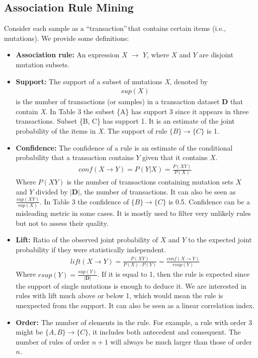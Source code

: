 \documentclass[twoside,twocolumn]{article}
\begin{document}
	\subsection{Association Rule Mining}
	Consider each sample as a \textquotedblleft transaction\textquotedblright$\,$that contains certain items (i.e., mutations). We provide some definitions:
	\begin{itemize}
		\item \textbf{Association rule:} An expression $X$ $\rightarrow$ $Y$, where $X$ and $Y$ are disjoint mutation subsets. 
		\item \textbf{Support:} The support of a subset of mutations \textit{X}, denoted by 
		\begin{align*}
			sup(X)
		\end{align*} is the number of transactions (or samples) in a transaction dataset \textbf{D} that contain \textit{X}. In Table 3 the subset \{A\} has support 3 since it appears in three transactions. Subset \{B, C\} has support 1. It is an estimate of the joint probability of the items in \textit{X}. The support of rule $\{B\} \rightarrow \{C\}$ is 1.
		\item \textbf{Confidence:} The confidence of a rule is an estimate of the conditional probability that a transaction contains $Y$ given that it contains $X$.
		\begin{align*}
			conf(X \rightarrow Y) = P(Y|X) = \frac{P(XY)}{P(X)}
		\end{align*}
		Where $P(XY)$ is the number of transactions containing mutation sets $X$ and $Y$ divided by $|\mathbf{D}|$, the number of transactions. It can also be seen as $\frac{sup(XY)}{sup(X)}$. In Table 3 the confidence of $\{B\} \rightarrow \{C\}$ is 0.5. Confidence can be a misleading metric in some cases. It is mostly used to filter very unlikely rules but not to assess their quality.
		\item \textbf{Lift:} Ratio of the observed joint probability of $X$ and $Y$ to the expected joint probability if they were statistically independent.	
		\begin{align*}
			lift(X \rightarrow Y) = \frac{P(XY)}{P(X)\cdot P(Y)} = \frac{conf(X\rightarrow Y)}{rsup(Y)}
		\end{align*}
		Where $rsup(Y) = \frac{sup(Y)}{|\mathbf{D}|}$. If it is equal to 1, then the rule is expected since the support of single mutations is enough to deduce it. We are interested in rules with lift much above or below 1, which would mean the rule is unexpected from the support. It can also be seen as a linear correlation index. 
		\item \textbf{Order: } The number of elements in the rule. For example, a rule with order 3 might be $\{A,B\} \rightarrow \{C\}$, it includes both antecedent and consequent. The number of rules of order $n + 1$ will always be much larger than those of order $n$.
	\end{itemize}
\end{document}
